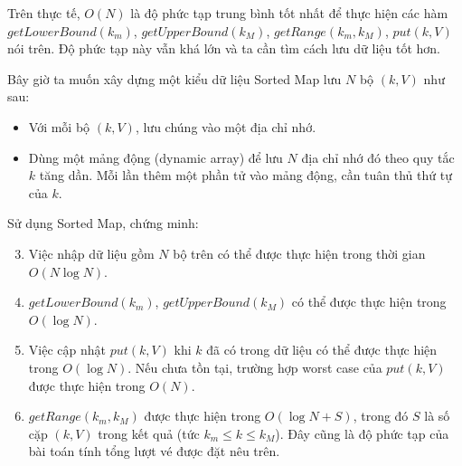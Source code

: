 \documentclass{article}
\begin{document}
Trên thực tế, $O(N)$ là độ phức tạp trung bình tốt nhất để thực hiện các hàm $getLowerBound(k_m)$, $getUpperBound(k_M)$, $getRange(k_m, k_M)$, $put(k, V)$ nói trên. Độ phức tạp này vẫn khá lớn và ta cần tìm cách lưu dữ liệu tốt hơn.

Bây giờ ta muốn xây dựng một kiểu dữ liệu Sorted Map lưu $N$ bộ $(k, V)$ như sau:
\begin{itemize}
	\item Với mỗi bộ $(k, V)$, lưu chúng vào một địa chỉ nhớ.
	\item Dùng một mảng động (dynamic array) để lưu $N$ địa chỉ nhớ đó theo quy tắc $k$ tăng dần. Mỗi lần thêm một phần tử vào mảng động, cần tuân thủ thứ tự của $k$.
\end{itemize}

Sử dụng Sorted Map, chứng minh:

 \begin{em}
	\begin{enumerate}
	    \setcounter{enumi}{2}
        \item Việc nhập dữ liệu gồm $N$ bộ trên có thể được thực hiện trong thời gian $O(N \log N)$.
		
		\item $getLowerBound(k_m)$, $getUpperBound(k_M)$ có thể được thực hiện trong $O(\log N)$.
		
		\item Việc cập nhật $put(k, V)$ khi $k$ đã có trong dữ liệu có thể được thực hiện trong $O(\log N)$. Nếu chưa tồn tại, trường hợp worst case của $put(k, V)$ được thực hiện trong $O(N)$.
		
		\item $getRange(k_m, k_M)$ được thực hiện trong $O(\log N + S)$, trong đó $S$ là số cặp $(k, V)$ trong kết quả (tức $k_m \leq k \leq k_M$). Đây cũng là độ phức tạp của bài toán tính tổng lượt vé được đặt nêu trên.
	\end{enumerate}
\end{em}
\end{document}

